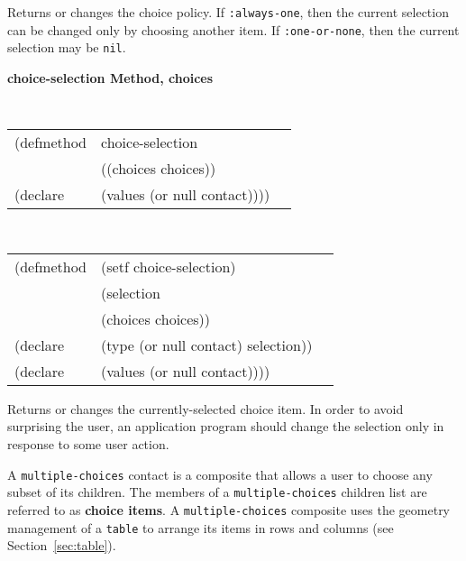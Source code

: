\begin{flushright} \parbox[t]{6.125in}{
Returns or changes the choice policy. If {\tt :always-one}, then the current
selection can be changed only by choosing another item. If {\tt :one-or-none}, then
the current selection may be {\tt nil}.

}\end{flushright}

{\samepage
{\large {\bf choice-selection \hfill Method, choices}}
\begin{flushright} \parbox[t]{6.125in}{
\tt
\begin{tabular}{lll}
\raggedright
(defmethod & choice-selection & \\
& ((choices  choices)) \\
(declare & (values (or null contact))))
\end{tabular}
\rm

}\end{flushright}}

{\samepage
\begin{flushright} \parbox[t]{6.125in}{
\tt
\begin{tabular}{lll}
\raggedright
(defmethod & (setf choice-selection) & \\
         & (selection \\
         & (choices choices)) \\
(declare &(type (or null contact)  selection))\\
(declare & (values (or null contact))))
\end{tabular}
\rm
}
\end{flushright}}



\begin{flushright} \parbox[t]{6.125in}{
Returns or changes the currently-selected choice item. In order to
avoid surprising the user, an application program should change the selection only in
response to some user action.

}\end{flushright}


\vfill
\pagebreak




A {\tt multiple-choices} contact is a composite that allows a user to choose any subset
of its children.  The members of a {\tt multiple-choices} children list are referred to
as {\bf choice items}.  A {\tt multiple-choices}
composite uses the
geometry management of a {\tt table} to arrange its items in rows and columns
(see Section~\ref{sec:table}).


